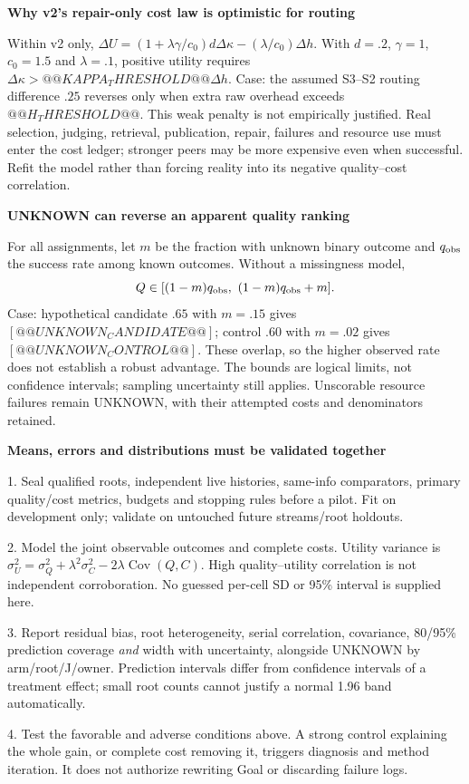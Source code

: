 \documentclass[10pt,a4paper]{article}
\newcommand{\lead}[1]{\vspace{4pt}\textbf{#1}\par}
\begin{document}
\lead{Why v2's repair-only cost law is optimistic for routing}
Within v2 only, $\Delta U=(1+\lambda\gamma/c_0)d\Delta\kappa
-(\lambda/c_0)\Delta h$. With $d=.2$, $\gamma=1$, $c_0=1.5$ and $\lambda=.1$,
positive utility requires $\Delta\kappa>@@KAPPA_THRESHOLD@@\Delta h$.
Case: the assumed S3--S2 routing difference $.25$ reverses only when extra raw
overhead exceeds $@@H_THRESHOLD@@$. This weak penalty is not empirically justified.
Real selection, judging, retrieval, publication, repair, failures and resource
use must enter the cost ledger; stronger peers may be more expensive even when
successful. Refit the model rather than forcing reality into its negative
quality--cost correlation.

\lead{UNKNOWN can reverse an apparent quality ranking}
For all assignments, let $m$ be the fraction with unknown binary outcome and
$q_{\rm obs}$ the success rate among known outcomes. Without a missingness model,
\[
 Q\in[(1-m)q_{\rm obs},\ (1-m)q_{\rm obs}+m].
\]
Case: hypothetical candidate $.65$ with $m=.15$ gives
$[@@UNKNOWN_CANDIDATE@@]$; control $.60$ with $m=.02$ gives
$[@@UNKNOWN_CONTROL@@]$. These overlap, so the higher observed rate does not
establish a robust advantage. The bounds are logical limits, not confidence
intervals; sampling uncertainty still applies. Unscorable resource failures
remain UNKNOWN, with their attempted costs and denominators retained.

\lead{Means, errors and distributions must be validated together}
\small
1. Seal qualified roots, independent live histories, same-info comparators,
primary quality/cost metrics, budgets and stopping rules before a pilot.
Fit on development only; validate on untouched future streams/root holdouts.\par
2. Model the joint observable outcomes and complete costs. Utility variance is
$\sigma_U^2=\sigma_Q^2+\lambda^2\sigma_C^2-2\lambda\operatorname{Cov}(Q,C)$.
High quality--utility correlation is not independent corroboration. No guessed
per-cell SD or 95\% interval is supplied here.\par
3. Report residual bias, root heterogeneity, serial correlation, covariance,
80/95\% prediction coverage \emph{and} width with uncertainty, alongside
UNKNOWN by arm/root/J/owner. Prediction intervals differ from confidence
intervals of a treatment effect; small root counts cannot justify a normal
1.96 band automatically.\par
4. Test the favorable and adverse conditions above. A strong control explaining
the whole gain, or complete cost removing it, triggers diagnosis and method
iteration. It does not authorize rewriting Goal or discarding failure logs.\normalsize
\end{document}
